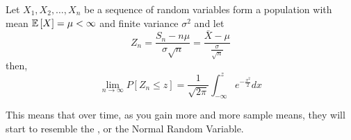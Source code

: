		\begin{theorem} \label{thm:Central Limit Theorem}
			Let $X_{1},X_{2},\ldots,X_{n}$ be a sequence of  random variables form a population with mean $\operatorname{\mathbb{E}} \left[ X \right] = \mu < \infty$ and finite variance $\sigma^{2}$ and let
			\begin{equation*}
				Z_{n} = \frac{S_{n} - n\mu}{\sigma \sqrt{n}} = \frac{\bar{X} - \mu}{\frac{\sigma}{\sqrt{n}}}
			\end{equation*}
			then,
			\begin{equation} \label{eq:Central Limit Theorem}
				\lim\limits_{n \rightarrow \infty} P \left[ Z_{n} \leq z \right] = \frac{1}{\sqrt{2 \pi}} \int_{-\infty}^{z} e^{-\frac{x^{2}}{2}} dx
			\end{equation}
			\begin{remark*}
				This means that over time, as you gain more and more sample means, they will start to resemble the , or the Normal Random Variable.
			\end{remark*}
		\end{theorem}